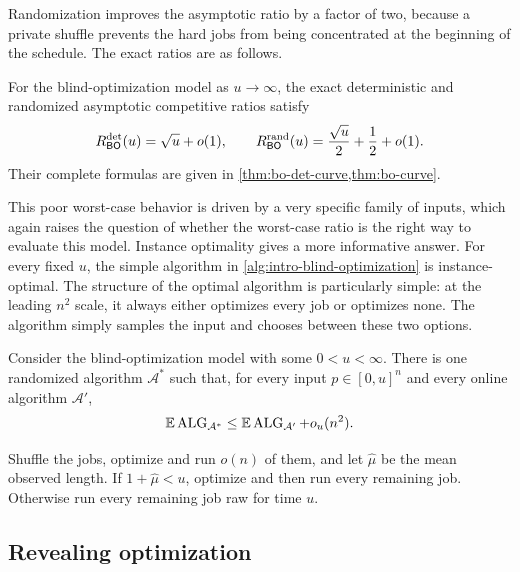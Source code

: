 Randomization improves the asymptotic ratio by a factor of two, because a
private shuffle prevents the hard jobs from being concentrated at the
beginning of the schedule.  The exact ratios are as follows.

\begin{theorem}
\label{thm:intro-bo-det-curve}
\label{thm:intro-bo-curve}
For the blind-optimization model as $u\to\infty$, the exact deterministic and randomized
asymptotic competitive ratios satisfy
\[
 R_{\mathsf{BO}}^{\mathrm{det}}(u)=\sqrt u+o(1),
 \qquad
 R_{\mathsf{BO}}^{\mathrm{rand}}(u)=\frac{\sqrt u}{2}+\frac12+o(1).
\]
Their complete formulas are given in
\cref{thm:bo-det-curve,thm:bo-curve}.
\end{theorem}

This poor worst-case behavior is driven by a very specific family of inputs,
which again raises the question of whether the worst-case ratio is the right
way to evaluate this model.  Instance optimality gives a more informative
answer.  For every fixed $u$, the simple algorithm in
\cref{alg:intro-blind-optimization} is instance-optimal.  The structure of
the optimal algorithm is particularly simple: at the leading $n^2$ scale, it
always either optimizes every job or optimizes none.  The algorithm simply
samples the input and chooses between these two options.

\begin{theorem}
\label{thm:intro-bo-instance}
Consider the blind-optimization model with some $0<u<\infty$.  There is one
randomized algorithm $\mathcal A^*$ such that, for every input
$p\in[0,u]^n$ and every online algorithm $\mathcal A'$,
\[
 \mathbb{E}\operatorname{ALG}_{\mathcal A^*}\le \mathbb{E}\operatorname{ALG}_{\mathcal A'}+o_u(n^2).
\]
\end{theorem}


\begin{algorithm}[H]
\caption{}
\label{alg:intro-blind-optimization}
\begin{algorithmic}
\State Shuffle the jobs, optimize and run $o(n)$ of them,
and let $\widehat\mu$ be the mean observed length.
\State If $1+\widehat\mu<u$, optimize and then run every remaining job.
\State Otherwise run every remaining job raw for time $u$.
\end{algorithmic}
\end{algorithm}

\subsection{Revealing optimization}
\label{sec:intro-revealing-optimization}

